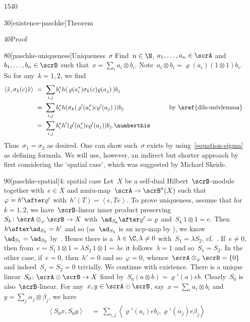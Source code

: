 \begin{parsec}{1540}
\begin{point}{30}[existence-paschke]{Theorem}
\begin{point}{40}{Proof}
\begin{point}{80}[paschke-uniqueness]{Uniqueness~$\sigma$}
Find~$n \in \N$, $a_1, \ldots, a_n\in \scrA$
    and~$b_1,\ldots,b_n \in \scrB$
    such that~$x = \sum_i a_i\otimes b_i$.
Note~$a_i \otimes b_i = \varrho(a_i) (1 \otimes 1)b_i$.
    So for any~$k=1,2$, we find
\begin{alignat*}{3}\label{equation-sigma}
    \left<\hat{x}, \sigma_k(c) \hat{x}\right>
    &\ =\ \sum_{i,j} b_i^* h(\, \varrho(a_i^*) \sigma_k(c) \varrho(a_j)\,)b_j\\
    &\ =\ \sum_{i,j} b_i^* h(\sigma_k(\, \varrho'(a_i^*) c \varrho'(a_j)\,))b_j &\qquad&\text{by \sref{dils-univlemma}}\\
    &\ =\ \sum_{i,j} b_i^* h'(\varrho'(a_i^*) c \varrho'(a_j)) b_j.\numberthis
\end{alignat*}
Thus~$\sigma_1=\sigma_2$ as desired.
One can show such~$\sigma$ exists by using~\eqref{equation-sigma}
    as defining formula.
We will use, however, an indirect but shorter approach
    by first considering the `spatial case',
    which was suggested by Michael Skeide.
\end{point}
\begin{point}{90}[paschke-spatial]{4: spatial case}%
Let~$X$ be a self-dual Hilbert~$\scrB$-module
    together with~$e \in X$ and nmiu-map~$\scrA \to \scrB^a(X)$
    such that~$\varphi = h' \after \varrho'$
    with~$h'(T) = \left<e,Te\right>$.
To prove uniqueness,
    assume that for~$k=1,2$,
    we have~$\scrB$-linear
    inner product preserving~$S_k \colon \scrA \otimes_\varphi \scrB \to X$
    with~$\ad_{S_k} \after \varrho' = \varrho$
    and~$S_k \, 1\otimes 1 = e$.
Then~$h \after \ad_{S_k} = h'$
    and so (as~$\ad_{S_k}$ is an ncp-map by ),
    we know~$\ad_{S_1} = \ad_{S_2}$ by~.
Hence there is a~$\lambda\in\C,\lambda\neq 0$
    with~$S_1 = \lambda S_2$, cf.~\cite[lemma 9]{westerbaan2016universal}.
If~$e \neq 0$,
    then from~$e = S_1\, 1\otimes 1 = \lambda S_2 \,1\otimes 1 = \lambda e$
    it follows~$\lambda = 1$ and so~$S_1 = S_2$.
In the other case, if~$e = 0$,
then~$h' = 0$ and so~$\varphi=0$,
    whence~$\scrA \otimes_\varphi \scrB = \{0\}$
    and indeed~$S_1=S_2=0$ trivially.
We continue with existence.
There is a unique linear~$S_0\colon \scrA \odot \scrB \to X$
    fixed by~$S_0(a\otimes b) = \varrho'(a) e b$.
Clearly~$S_0$ is also~$\scrB$-linear.
For any~$x,y \in \scrA\odot \scrB$,
    say~$x = \sum_i a_i\otimes b_i$ and~$y = \sum_j \alpha_j \otimes \beta_j$,
    we have
\begin{align*}
    \left< S_0 x, S_0 y \right>
    & \ =\ \sum_{i,j} \left<\varrho'(a_i)e b_i, \varrho'(\alpha_j)e \beta_j \right> \\

\end{align*}
\end{point}
\end{point}
\end{point}
\end{parsec}
